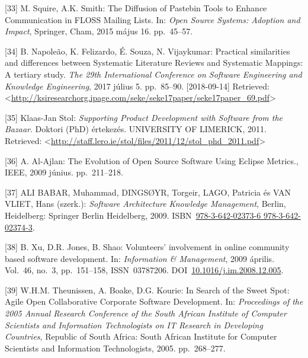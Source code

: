 \documentclass[12pt,magyar,a4paper,oneside]{scrreprt}
\begin{document}
\leavevmode\hypertarget{ref-squire_diffusion_2015}{}%
{[}33{]} M. Squire, A.K. Smith: The Diffusion of Pastebin Tools to
Enhance Communication in FLOSS Mailing Lists. In: \emph{Open Source
Systems: Adoption and Impact}, Springer, Cham, 2015 május 16.
pp.~45--57.

\leavevmode\hypertarget{ref-napoleao_practical_2017}{}%
{[}34{]} B. Napoleão, K. Felizardo, É. Souza, N. Vijaykumar: Practical
similarities and differences between Systematic Literature Reviews and
Systematic Mappings: A tertiary study. \emph{The 29th International
Conference on Software Engineering and Knowledge Engineering}, 2017
július 5. pp.~85--90. {[}2018-09-14{]} Retrieved:
\textless{}\url{http://ksiresearchorg.ipage.com/seke/seke17paper/seke17paper_69.pdf}\textgreater{}

\leavevmode\hypertarget{ref-klaas-jan_stol_supporting_2011}{}%
{[}35{]} Klaas-Jan Stol: \emph{Supporting Product Development with
Software from the Bazaar}. Doktori (PhD) értekezés. UNIVERSITY OF
LIMERICK, 2011. Retrieved:
\textless{}\url{http://staff.lero.ie/stol/files/2011/12/stol_phd_2011.pdf}\textgreater{}

\leavevmode\hypertarget{ref-al-ajlan_evolution_2009}{}%
{[}36{]} A. Al-Ajlan: The Evolution of Open Source Software Using
Eclipse Metrics., IEEE, 2009 június. pp.~211--218.

\leavevmode\hypertarget{ref-ali_babar_software_2009}{}%
{[}37{]} ALI BABAR, Muhammad, DINGSØYR, Torgeir, LAGO, Patricia és VAN
VLIET, Hans (szerk.): \emph{Software Architecture Knowledge Management},
Berlin, Heidelberg: Springer Berlin Heidelberg, 2009.
ISBN~\href{https://worldcat.org/isbn/978-3-642-02373-6\%20978-3-642-02374-3}{978-3-642-02373-6 978-3-642-02374-3}.

\leavevmode\hypertarget{ref-xu_volunteers_2009}{}%
{[}38{]} B. Xu, D.R. Jones, B. Shao: Volunteers' involvement in online
community based software development. In: \emph{Information \&
Management}, 2009 április. Vol.~46, no.~3, pp.~151--158, ISSN~03787206.
DOI~\href{https://doi.org/10.1016/j.im.2008.12.005}{10.1016/j.im.2008.12.005}.

\leavevmode\hypertarget{ref-theunissen_search_2005}{}%
{[}39{]} W.H.M. Theunissen, A. Boake, D.G. Kourie: In Search of the
Sweet Spot: Agile Open Collaborative Corporate Software Development. In:
\emph{Proceedings of the 2005 Annual Research Conference of the South
African Institute of Computer Scientists and Information Technologists
on IT Research in Developing Countries}, Republic of South Africa: South
African Institute for Computer Scientists and Information Technologists,
2005. pp.~268--277.
\end{document}
